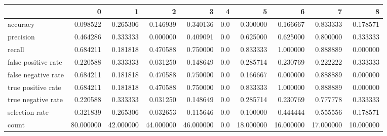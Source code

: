 \begin{tabular}{lrrrrrrrrr}
\toprule
{} &          0 &          1 &          2 &          3 &    4 &          5 &          6 &          7 &          8 \\
\midrule
accuracy            &   0.098522 &   0.265306 &   0.146939 &   0.340136 &  0.0 &   0.300000 &   0.166667 &   0.833333 &   0.178571 \\
precision           &   0.464286 &   0.333333 &   0.000000 &   0.409091 &  0.0 &   0.625000 &   0.625000 &   0.800000 &   0.333333 \\
recall              &   0.684211 &   0.181818 &   0.470588 &   0.750000 &  0.0 &   0.833333 &   1.000000 &   0.888889 &   0.000000 \\
false positive rate &   0.220588 &   0.333333 &   0.031250 &   0.148649 &  0.0 &   0.285714 &   0.230769 &   0.222222 &   0.333333 \\
false negative rate &   0.684211 &   0.181818 &   0.470588 &   0.750000 &  0.0 &   0.166667 &   0.000000 &   0.888889 &   0.000000 \\
true positive rate  &   0.684211 &   0.181818 &   0.470588 &   0.750000 &  0.0 &   0.833333 &   1.000000 &   0.888889 &   0.000000 \\
true negative rate  &   0.220588 &   0.333333 &   0.031250 &   0.148649 &  0.0 &   0.285714 &   0.230769 &   0.777778 &   0.333333 \\
selection rate      &   0.321839 &   0.265306 &   0.032653 &   0.115646 &  0.0 &   0.100000 &   0.444444 &   0.555556 &   0.178571 \\
count               &  80.000000 &  42.000000 &  44.000000 &  46.000000 &  0.0 &  18.000000 &  16.000000 &  17.000000 &  10.000000 \\
\bottomrule
\end{tabular}
